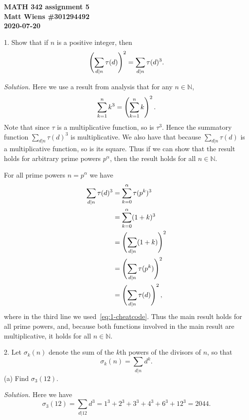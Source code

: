 \documentclass{article}
\newcommand{\N}{\mathbb{N}}
\begin{document}
\textbf{MATH 342 assignment 5} \\
\textbf{Matt Wiens \#301294492} \\
\textbf{2020-07-20}

1. Show that if $n$ is a positive integer, then
%
\begin{equation*}
    \del[4]{\sum_{d|n} \tau(d)}^2 = \sum_{d|n} \tau(d)^3
    .
\end{equation*}

\textit{Solution.}
Here we use a result from analysis that for any $n \in \N$,
%
\begin{equation}
    \sum_{k = 1}^n k^3 = \del[4]{\sum_{k = 1}^n k}^2
    \label{eq:1-cheatcode}
    .
\end{equation}
%
Note that since $\tau$ is a multiplicative function, so is $\tau^3$.
Hence the summatory function $\sum_{d|n} \tau(d)^3$ is multiplicative.
We also have that because $\sum_{d|n} \tau(d)$ is a multiplicative
function, so is its square. Thus if we can show that the result holds
for arbitrary prime powers $p^\alpha$, then the result holds for all
$n \in \N$.

For all prime powers $n = p^\alpha$ we have
%
\begin{align*}
    \sum_{d|n} \tau(d)^3
        &= \sum_{k = 0}^\alpha \tau(p^k)^3 \\
        &= \sum_{k = 0}^\alpha (1 + k)^3 \\
        &= \del[4]{\sum_{d|n} (1 + k)}^2 \\
        &= \del[4]{\sum_{d|n} \tau(p^k)}^2 \\
        &= \del[4]{\sum_{d|n} \tau(d)}^2
        ,
\end{align*}
%
where in the third line we used~\eqref{eq:1-cheatcode}. Thus
the main result holds for all prime powers, and, because both
functions involved in the main result are multiplicative, it holds for
all $n \in \N$.

\newpage

2. Let $\sigma_k(n)$ denote the sum of the $k$th powers of the divisors
of $n$, so that
%
\begin{equation*}
    \sigma_k(n) = \sum_{d|n} d^k
    .
\end{equation*}
%
(a) Find $\sigma_3(12)$.

\textit{Solution.}
Here we have
%
\begin{equation*}
    \sigma_3(12)
        = \sum_{d|12} d^3
        = 1^3 + 2^3 + 3^3 + 4^3 + 6^3 + 12^3
        = 2044
        .
\end{equation*}
\end{document}
